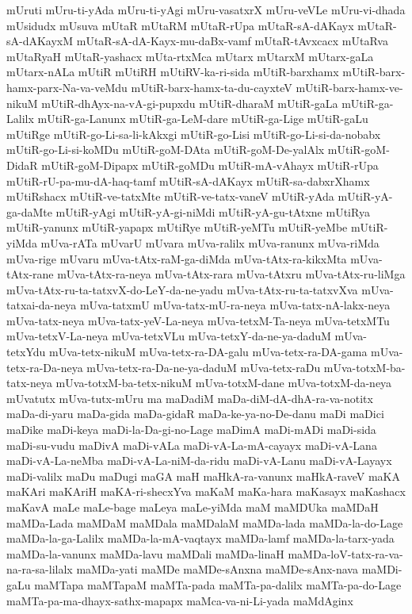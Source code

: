 {mUruti
mUru-ti-yAda
mUru-ti-yAgi
mUru-vasatxrX
mUru-veVLe
mUru-vi-dhada
mUsidudx
mUsuva
mUtaR
mUtaRM
mUtaR-rUpa
mUtaR-sA-dAKayx
mUtaR-sA-dAKayxM
mUtaR-sA-dA-Kayx-mu-daBx-vamf
mUtaR-tAvxcacx
mUtaRva
mUtaRyaH
mUtaR-yashacx
mUta-rtxMca
mUtarx
mUtarxM
mUtarx-gaLa
mUtarx-nALa
mUtiR
mUtiRH
mUtiRV-ka-ri-sida
mUtiR-barxhamx
mUtiR-barx-hamx-parx-Na-va-veMdu
mUtiR-barx-hamx-ta-du-cayxteV
mUtiR-barx-hamx-ve-nikuM
mUtiR-dhAyx-na-vA-gi-pupxdu
mUtiR-dharaM
mUtiR-gaLa
mUtiR-ga-Lalilx
mUtiR-ga-Lanunx
mUtiR-ga-LeM-dare
mUtiR-ga-Lige
mUtiR-gaLu
mUtiRge
mUtiR-go-Li-sa-li-kAkxgi
mUtiR-go-Lisi
mUtiR-go-Li-si-da-nobabx
mUtiR-go-Li-si-koMDu
mUtiR-goM-DAta
mUtiR-goM-De-yalAlx
mUtiR-goM-DidaR
mUtiR-goM-Dipapx
mUtiR-goMDu
mUtiR-mA-vAhayx
mUtiR-rUpa
mUtiR-rU-pa-mu-dA-haq-tamf
mUtiR-sA-dAKayx
mUtiR-sa-dabxrXhamx
mUtiRshacx
mUtiR-ve-tatxMte
mUtiR-ve-tatx-vaneV
mUtiR-yAda
mUtiR-yA-ga-daMte
mUtiR-yAgi
mUtiR-yA-gi-niMdi
mUtiR-yA-gu-tAtxne
mUtiRya
mUtiR-yanunx
mUtiR-yapapx
mUtiRye
mUtiR-yeMTu
mUtiR-yeMbe
mUtiR-yiMda
mUva-rATa
mUvarU
mUvara
mUva-ralilx
mUva-ranunx
mUva-riMda
mUva-rige
mUvaru
mUva-tAtx-raM-ga-diMda
mUva-tAtx-ra-kikxMta
mUva-tAtx-rane
mUva-tAtx-ra-neya
mUva-tAtx-rara
mUva-tAtxru
mUva-tAtx-ru-liMga
mUva-tAtx-ru-ta-tatxvX-do-LeY-da-ne-yadu
mUva-tAtx-ru-ta-tatxvXva
mUva-tatxai-da-neya
mUva-tatxmU
mUva-tatx-mU-ra-neya
mUva-tatx-nA-lakx-neya
mUva-tatx-neya
mUva-tatx-yeV-La-neya
mUva-tetxM-Ta-neya
mUva-tetxMTu
mUva-tetxV-La-neya
mUva-tetxVLu
mUva-tetxY-da-ne-ya-daduM
mUva-tetxYdu
mUva-tetx-nikuM
mUva-tetx-ra-DA-galu
mUva-tetx-ra-DA-gama
mUva-tetx-ra-Da-neya
mUva-tetx-ra-Da-ne-ya-daduM
mUva-tetx-raDu
mUva-totxM-ba-tatx-neya
mUva-totxM-ba-tetx-nikuM
mUva-totxM-dane
mUva-totxM-da-neya
mUvatutx
mUva-tutx-mUru
ma
maDadiM
maDa-diM-dA-dhA-ra-va-notitx
maDa-di-yaru
maDa-gida
maDa-gidaR
maDa-ke-ya-no-De-danu
maDi
maDici
maDike
maDi-keya
maDi-la-Da-gi-no-Lage
maDimA
maDi-mADi
maDi-sida
maDi-su-vudu
maDivA
maDi-vALa
maDi-vA-La-mA-cayayx
maDi-vA-Lana
maDi-vA-La-neMba
maDi-vA-La-niM-da-ridu
maDi-vA-Lanu
maDi-vA-Layayx
maDi-valilx
maDu
maDugi
maGA
maH
maHkA-ra-vanunx
maHkA-raveV
maKA
maKAri
maKAriH
maKA-ri-shecxYva
maKaM
maKa-hara
maKasayx
maKashacx
maKavA
maLe
maLe-bage
maLeya
maLe-yiMda
maM
maMDUka
maMDaH
maMDa-Lada
maMDaM
maMDala
maMDalaM
maMDa-lada
maMDa-la-do-Lage
maMDa-la-ga-Lalilx
maMDa-la-mA-vaqtayx
maMDa-lamf
maMDa-la-tarx-yada
maMDa-la-vanunx
maMDa-lavu
maMDali
maMDa-linaH
maMDa-loV-tatx-ra-va-na-ra-sa-lilalx
maMDa-yati
maMDe
maMDe-sAnxna
maMDe-sAnx-nava
maMDi-gaLu
maMTapa
maMTapaM
maMTa-pada
maMTa-pa-dalilx
maMTa-pa-do-Lage
maMTa-pa-ma-dhayx-sathx-mapapx
maMca-va-ni-Li-yada
maMdAginx
}
